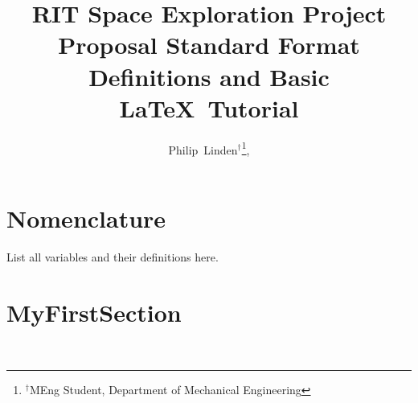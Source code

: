 \documentclass[journal]{SPEXformat}
\title{RIT Space Exploration Project Proposal Standard Format Definitions and Basic \LaTeX\ Tutorial}
\author{
  Philip~Linden$^{\dagger}$\thanks{$^{\dagger}$MEng Student, Department of Mechanical Engineering},
}
\begin{document}
\maketitle

\begin{abstract}
\blindtext[1]
\end{abstract}

\section{Nomenclature}
\label{sec:nomenclature}
List all variables and their definitions here.

\section{MyFirstSection}
\label{sec:section1}
\blindtext\
\end{document}

